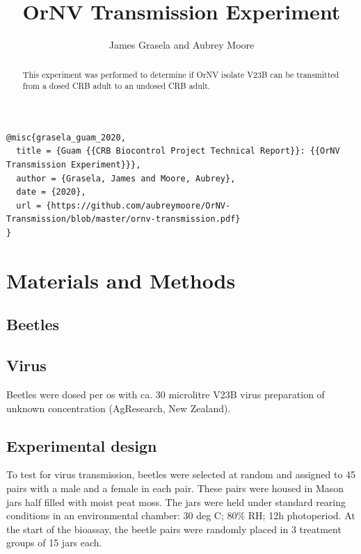 \documentclass[11pt,letterpaper]{scrartcl}
\begin{document}
\title{OrNV Transmission Experiment}
\author{James Grasela and Aubrey Moore}
\maketitle

\begin{scriptsize}
\begin{verbatim}
@misc{grasela_guam_2020,
  title = {Guam {{CRB Biocontrol Project Technical Report}}: {{OrNV Transmission Experiment}}},
  author = {Grasela, James and Moore, Aubrey},
  date = {2020},
  url = {https://github.com/aubreymoore/OrNV-Transmission/blob/master/ornv-transmission.pdf}
}
\end{verbatim}
\end{scriptsize}

\begin{abstract}
This experiment was performed to determine if OrNV isolate V23B can be transmitted from a dosed CRB adult to an undosed CRB 
adult.
\end{abstract}

\section{Materials and Methods}

\subsection{Beetles}

\subsection{Virus}

Beetles were dosed per os with ca. 30 microlitre V23B virus preparation of unknown concentration (AgResearch, New Zealand).

\subsection{Experimental design}

To test for virus transmission, beetles were selected at random and assigned to 45 pairs with a male and a female 
in each pair. These pairs were housed in Mason jars half filled with moist peat moss. The jars were held under 
standard rearing conditions in an environmental chamber: 30 deg C; 80\% RH; 12h photoperiod. At the start of the 
bioassay, the beetle pairs were randomly placed in 3 treatment groups of 15 jars each. 
\end{document}
